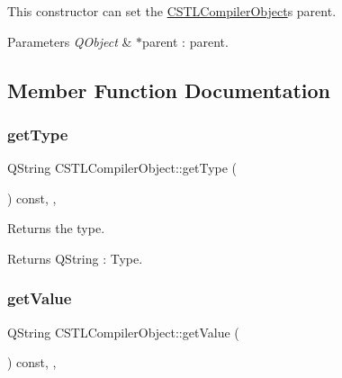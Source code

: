 This constructor can set the \hyperlink{class_c_s_t_l_compiler_object}{C\+S\+T\+L\+Compiler\+Object}\textquotesingle{}s parent. 


\begin{DoxyParams}{Parameters}
{\em Q\+Object} & $\ast$parent \+: parent. \\
\hline
\end{DoxyParams}


\subsection{Member Function Documentation}
\mbox{\label{class_c_s_t_l_compiler_object_a99e470396326c2895ffc63a5bc233add}} 
\subsubsection{\texorpdfstring{get\+Type}{getType}}
{\footnotesize\ttfamily Q\+String C\+S\+T\+L\+Compiler\+Object\+::get\+Type (\begin{DoxyParamCaption}{ }\end{DoxyParamCaption}) const\hspace{0.3cm}{\ttfamily [inline]}, {\ttfamily [slot]}, {\ttfamily [noexcept]}}



Returns the type. 

\begin{DoxyReturn}{Returns}
Q\+String \+: Type. 
\end{DoxyReturn}
\mbox{\label{class_c_s_t_l_compiler_object_ae09aa0cd4fe3da1d07cec05f734d2fab}} 
\subsubsection{\texorpdfstring{get\+Value}{getValue}}
{\footnotesize\ttfamily Q\+String C\+S\+T\+L\+Compiler\+Object\+::get\+Value (\begin{DoxyParamCaption}{ }\end{DoxyParamCaption}) const\hspace{0.3cm}{\ttfamily [inline]}, {\ttfamily [slot]}, {\ttfamily [noexcept]}}




